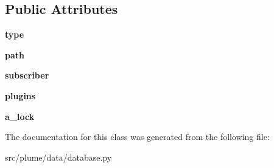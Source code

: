 \subsection*{Public Attributes}
\begin{DoxyCompactItemize}
\item 
{\bfseries type}\hypertarget{classplume-creator_1_1src_1_1plume_1_1data_1_1database_1_1_database_a4b72dbf6d017526dcdbbdd33a2273f4d}{}\label{classplume-creator_1_1src_1_1plume_1_1data_1_1database_1_1_database_a4b72dbf6d017526dcdbbdd33a2273f4d}

\item 
{\bfseries path}\hypertarget{classplume-creator_1_1src_1_1plume_1_1data_1_1database_1_1_database_a638b17bb08c81c796353441fc7f343c4}{}\label{classplume-creator_1_1src_1_1plume_1_1data_1_1database_1_1_database_a638b17bb08c81c796353441fc7f343c4}

\item 
{\bfseries subscriber}\hypertarget{classplume-creator_1_1src_1_1plume_1_1data_1_1database_1_1_database_a650fb97c1602e4a594d8acf2a924d9b4}{}\label{classplume-creator_1_1src_1_1plume_1_1data_1_1database_1_1_database_a650fb97c1602e4a594d8acf2a924d9b4}

\item 
{\bfseries plugins}\hypertarget{classplume-creator_1_1src_1_1plume_1_1data_1_1database_1_1_database_af84b73f1f79895fdefcaa8043e7cdb40}{}\label{classplume-creator_1_1src_1_1plume_1_1data_1_1database_1_1_database_af84b73f1f79895fdefcaa8043e7cdb40}

\item 
{\bfseries a\+\_\+lock}\hypertarget{classplume-creator_1_1src_1_1plume_1_1data_1_1database_1_1_database_a965d9db769361c5c7725dcab719b954c}{}\label{classplume-creator_1_1src_1_1plume_1_1data_1_1database_1_1_database_a965d9db769361c5c7725dcab719b954c}

\end{DoxyCompactItemize}


The documentation for this class was generated from the following file\+:\begin{DoxyCompactItemize}
\item 
src/plume/data/database.\+py\end{DoxyCompactItemize}
